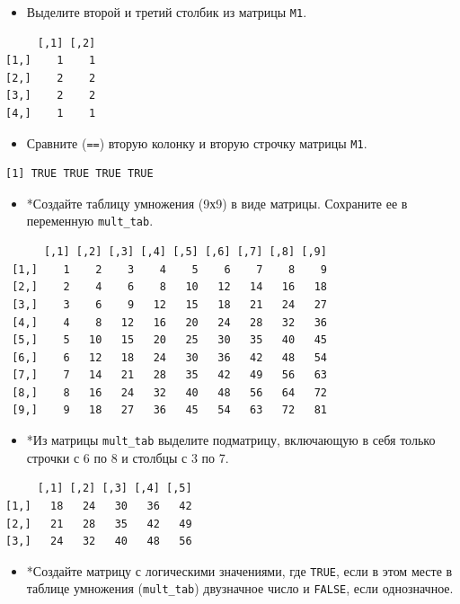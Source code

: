 \documentclass[
]{book}
\providecommand{\tightlist}{%
  \setlength{\itemsep}{0pt}\setlength{\parskip}{0pt}}
\begin{document}
\begin{itemize}
\tightlist
\item
  Выделите второй и третий столбик из матрицы \texttt{M1}.
\end{itemize}

\begin{verbatim}
     [,1] [,2]
[1,]    1    1
[2,]    2    2
[3,]    2    2
[4,]    1    1
\end{verbatim}

\begin{itemize}
\tightlist
\item
  Сравните (\texttt{==}) вторую колонку и вторую строчку матрицы \texttt{M1}.
\end{itemize}

\begin{verbatim}
[1] TRUE TRUE TRUE TRUE
\end{verbatim}

\begin{itemize}
\tightlist
\item
  *Создайте таблицу умножения (9х9) в виде матрицы. Сохраните ее в переменную \texttt{mult\_tab}.
\end{itemize}

\begin{verbatim}
      [,1] [,2] [,3] [,4] [,5] [,6] [,7] [,8] [,9]
 [1,]    1    2    3    4    5    6    7    8    9
 [2,]    2    4    6    8   10   12   14   16   18
 [3,]    3    6    9   12   15   18   21   24   27
 [4,]    4    8   12   16   20   24   28   32   36
 [5,]    5   10   15   20   25   30   35   40   45
 [6,]    6   12   18   24   30   36   42   48   54
 [7,]    7   14   21   28   35   42   49   56   63
 [8,]    8   16   24   32   40   48   56   64   72
 [9,]    9   18   27   36   45   54   63   72   81
\end{verbatim}

\begin{itemize}
\tightlist
\item
  *Из матрицы \texttt{mult\_tab} выделите подматрицу, включающую в себя только строчки с 6 по 8 и столбцы с 3 по 7.
\end{itemize}

\begin{verbatim}
     [,1] [,2] [,3] [,4] [,5]
[1,]   18   24   30   36   42
[2,]   21   28   35   42   49
[3,]   24   32   40   48   56
\end{verbatim}

\begin{itemize}
\tightlist
\item
  *Создайте матрицу с логическими значениями, где \texttt{TRUE}, если в этом месте в таблице умножения (\texttt{mult\_tab}) двузначное число и \texttt{FALSE}, если однозначное.
\end{itemize}
\end{document}
